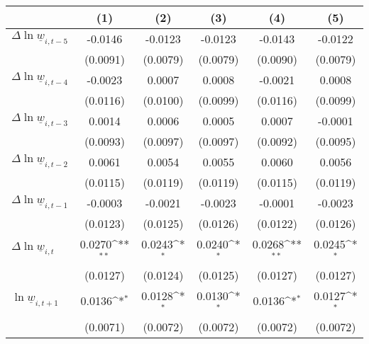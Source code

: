 {
\def\sym#1{\ifmmode^{#1}\else\(^{#1}\)\fi}
\begin{tabular}{l*{5}{c}}
\hline\hline
          &\multicolumn{1}{c}{(1)}         &\multicolumn{1}{c}{(2)}         &\multicolumn{1}{c}{(3)}         &\multicolumn{1}{c}{(4)}         &\multicolumn{1}{c}{(5)}         \\
\hline
$\Delta \ln \underline{w}_{i,t-5}$&  -0.0146         &  -0.0123         &  -0.0123         &  -0.0143         &  -0.0122         \\
          & (0.0091)         & (0.0079)         & (0.0079)         & (0.0090)         & (0.0079)         \\
[1em]
$\Delta \ln \underline{w}_{i,t-4}$&  -0.0023         &   0.0007         &   0.0008         &  -0.0021         &   0.0008         \\
          & (0.0116)         & (0.0100)         & (0.0099)         & (0.0116)         & (0.0099)         \\
[1em]
$\Delta \ln \underline{w}_{i,t-3}$&   0.0014         &   0.0006         &   0.0005         &   0.0007         &  -0.0001         \\
          & (0.0093)         & (0.0097)         & (0.0097)         & (0.0092)         & (0.0095)         \\
[1em]
$\Delta \ln \underline{w}_{i,t-2}$&   0.0061         &   0.0054         &   0.0055         &   0.0060         &   0.0056         \\
          & (0.0115)         & (0.0119)         & (0.0119)         & (0.0115)         & (0.0119)         \\
[1em]
$\Delta \ln \underline{w}_{i,t-1}$&  -0.0003         &  -0.0021         &  -0.0023         &  -0.0001         &  -0.0023         \\
          & (0.0123)         & (0.0125)         & (0.0126)         & (0.0122)         & (0.0126)         \\
[1em]
$\Delta \ln \underline{w}_{i,t}$&   0.0270\sym{**} &   0.0243\sym{*}  &   0.0240\sym{*}  &   0.0268\sym{**} &   0.0245\sym{*}  \\
          & (0.0127)         & (0.0124)         & (0.0125)         & (0.0127)         & (0.0127)         \\
[1em]
$\ln \underline{w}_{i,t+1}$&   0.0136\sym{*}  &   0.0128\sym{*}  &   0.0130\sym{*}  &   0.0136\sym{*}  &   0.0127\sym{*}  \\
          & (0.0071)         & (0.0072)         & (0.0072)         & (0.0072)         & (0.0072)         \\

\end{tabular}}
